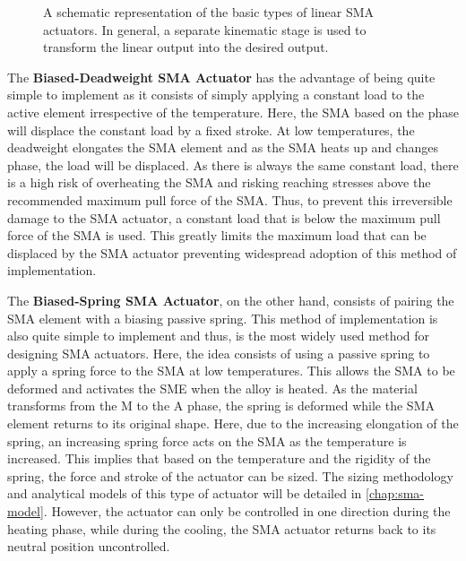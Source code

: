 \begin{figure}[hbt!]
    \centering
    
    \caption{A schematic representation of the basic types of linear SMA actuators. In general, a separate kinematic stage is used to transform the linear output into the desired output.}
    \label{fig:sma-actuators-diagram}
\end{figure}
The \textbf{Biased-Deadweight SMA Actuator} has the advantage of being quite simple to implement as it consists of simply applying a constant load to the active element irrespective of the temperature. Here, the SMA based on the phase will displace the constant load by a fixed stroke. At low temperatures, the deadweight elongates the SMA element and as the SMA heats up and changes phase, the load will be displaced. As there is always the same constant load, there is a high risk of overheating the SMA and risking reaching stresses above the recommended maximum pull force of the SMA. Thus, to prevent this irreversible damage to the SMA actuator, a constant load that is below the maximum pull force of the SMA is used. This greatly limits the maximum load that can be displaced by the SMA actuator preventing widespread adoption of this method of implementation.

The \textbf{Biased-Spring SMA Actuator}, on the other hand, consists of pairing the SMA element with a biasing passive spring. This method of implementation is also quite simple to implement and thus, is the most widely used method for designing SMA actuators. Here, the idea consists of using a passive spring to apply a spring force to the SMA at low temperatures. This allows the SMA to be deformed and activates the SME when the alloy is heated. As the material transforms from the M to the A phase, the spring is deformed while the SMA element returns to its original shape. Here, due to the increasing elongation of the spring, an increasing spring force acts on the SMA as the temperature is increased. This implies that based on the temperature and the rigidity of the spring, the force and stroke of the actuator can be sized. The sizing methodology and analytical models of this type of actuator will be detailed in \cref{chap:sma-model}. However, the actuator can only be controlled in one direction during the heating phase, while during the cooling, the SMA actuator returns back to its neutral position uncontrolled.


